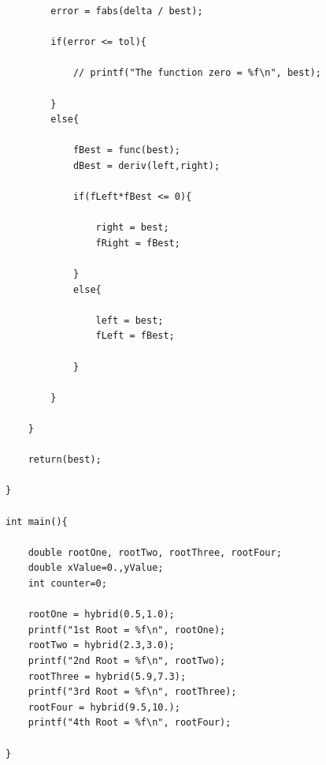 \documentclass[12pt]{article}
\begin{document}
\begin{verbatim}
		error = fabs(delta / best);

		if(error <= tol){

			// printf("The function zero = %f\n", best);

		}
		else{

			fBest = func(best);
			dBest = deriv(left,right);

			if(fLeft*fBest <= 0){

				right = best;
				fRight = fBest;

			}
			else{

				left = best;
				fLeft = fBest;

			}

		}

	}

	return(best);

}

int main(){

	double rootOne, rootTwo, rootThree, rootFour;
	double xValue=0.,yValue;
	int counter=0;
	
	rootOne = hybrid(0.5,1.0);
	printf("1st Root = %f\n", rootOne);
	rootTwo = hybrid(2.3,3.0);
	printf("2nd Root = %f\n", rootTwo);
	rootThree = hybrid(5.9,7.3);
	printf("3rd Root = %f\n", rootThree);
	rootFour = hybrid(9.5,10.);
	printf("4th Root = %f\n", rootFour);

}
\end{verbatim}
\end{document}
